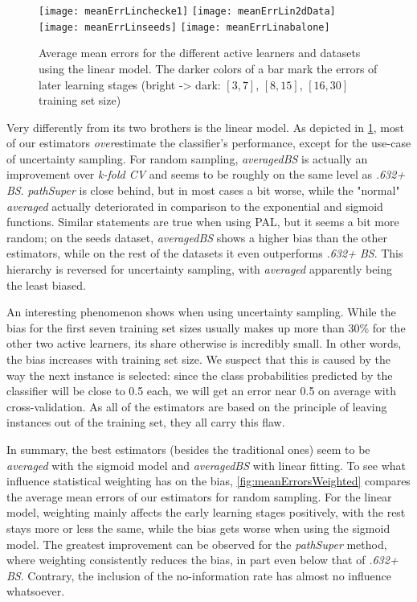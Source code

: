 \begin{figure}[h]
	\centering
	\texttt{[image: meanErrLinchecke1]}
	\texttt{[image: meanErrLin2dData]}
	\texttt{[image: meanErrLinseeds]}
	\texttt{[image: meanErrLinabalone]}
	\caption{Average mean errors for the different active learners and datasets using the linear model. The darker colors of a bar mark the errors of later learning stages (bright -> dark: $[3,7]$, $[8,15]$, $[16,30]$ training set size)}
	\label{fig:meanErrorsLin}
\end{figure}

Very differently from its two brothers is the linear model. As depicted in \ref{fig:meanErrorsLin}, most of our estimators \textit{over}estimate the classifier's performance, except for the use-case of uncertainty sampling. For random sampling, \textit{averagedBS} is actually an improvement over \textit{k-fold CV} and seems to be roughly on the same level as \textit{.632+ BS}. \textit{pathSuper} is close behind, but in most cases a bit worse, while the "normal" \textit{averaged} actually deteriorated in comparison to the exponential and sigmoid functions. Similar statements are true when using PAL, but it seems a bit more random; on the seeds dataset, \textit{averagedBS} shows a higher bias than the other estimators, while on the rest of the datasets it even outperforms \textit{.632+ BS}. This hierarchy is reversed for uncertainty sampling, with \textit{averaged} apparently being the least biased.

An interesting phenomenon shows when using uncertainty sampling. While the bias for the first seven training set sizes usually makes up more than 30\% for the other two active learners, its share otherwise is incredibly small. In other words, the bias increases with training set size. We suspect that this is caused by the way the next instance is selected: since the class probabilities predicted by the classifier will be close to 0.5 each, we will get an error near 0.5 on average with cross-validation. As all of the estimators are based on the principle of leaving instances out of the training set, they all carry this flaw.

In summary, the best estimators (besides the traditional ones) seem to be \textit{averaged} with the sigmoid model and \textit{averagedBS} with linear fitting. To see what influence statistical weighting has on the bias, \ref{fig:meanErrorsWeighted} compares the average mean errors of our estimators for random sampling. For the linear model, weighting mainly affects the early learning stages positively, with the rest stays more or less the same, while the bias gets worse when using the sigmoid model. The greatest improvement can be observed for the \textit{pathSuper} method, where weighting consistently reduces the bias, in part even below that of \textit{.632+ BS}. Contrary, the inclusion of the no-information rate has almost no influence whatsoever.

